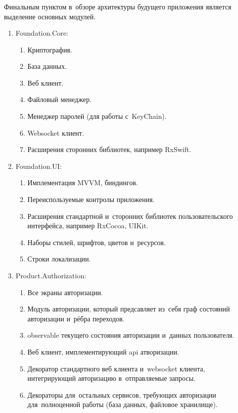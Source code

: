 \subsubsection{}
\label{sec:development:arch:ios:modules}

Финальным пунктом в~обзоре архитектуры будущего приложения является выделение основных модулей.

\begin{enumerate}
	
	\item Foundation.Core:
	\begin{enumerate}
		\item Криптография.
		\item База данных.
		\item Веб клиент.
		\item Файловый менеджер.
		\item Менеджер паролей (для работы с~KeyChain).
		\item Websocket клиент.
		\item Расширения сторонних библиотек, например RxSwift.
	\end{enumerate}

	\item Foundation.UI:
	\begin{enumerate}
		\item Имплементация MVVM, биндингов.
		\item Переиспользуемые контролы приложения.
		\item Расширения стандартной и~сторонних библиотек пользовательского интерфейса, например RxCocoa, UIKit.
		\item Наборы стилей, шрифтов, цветов и~ресурсов.
		\item Строки локализации.
	\end{enumerate}

	\item Product.Authorization:
	\begin{enumerate}
		\item Все экраны авторизации.
		\item Модуль авторизации, который предсавляет из~себя граф состояний авторизации и~рёбра переходов.
		\item \gls{observable} текущего состояния авторизации и~данных пользователя.
		\item Веб клиент, имплементирующий \gls{api} атворизации.
		\item Декоратор стандартного веб клиента и~websocket клиента, интегрирующий авторизацию в~отправляемые запросы.
		\item Декораторы для~остальных сервисов, требующих авторизации для~полноценной работы (база данных, файловое хранилище).
	\end{enumerate}


\end{enumerate}
